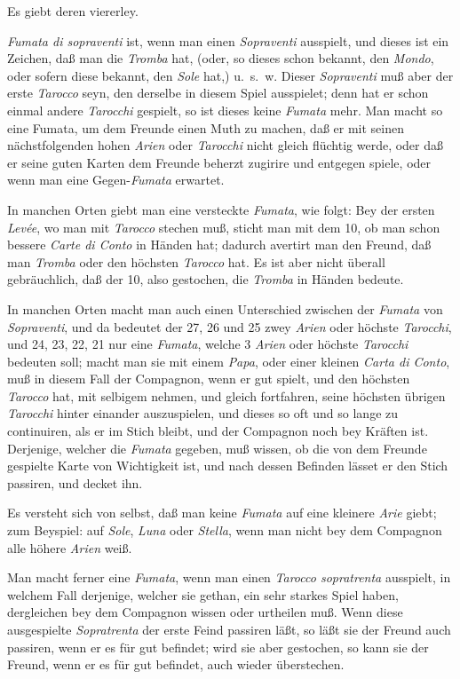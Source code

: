 \documentclass[11pt,a6paper,twoside]{article}
\begin{document}
Es giebt deren viererley.

\textit{Fumata di sopraventi} ist, wenn man einen \textit{Sopraventi} ausspielt, und dieses ist ein Zeichen, daß man die \textit{Tromba} hat, (oder, so dieses schon bekannt, den \textit{Mondo}, oder sofern diese bekannt, den \textit{Sole} hat,) u.~s.~w. Dieser \textit{Sopraventi} muß aber der erste \textit{Tarocco} seyn, den derselbe in diesem Spiel ausspielet; denn hat er schon einmal andere \textit{Tarocchi} gespielt, so ist dieses keine \textit{Fumata} mehr. Man macht so eine Fumata, um dem Freunde einen Muth zu machen, daß er mit seinen nächstfolgenden hohen \textit{Arien} oder \textit{Tarocchi} nicht gleich flüchtig werde, oder daß er seine guten Karten dem Freunde beherzt zugirire und entgegen spiele, oder wenn man eine Gegen-\textit{Fumata} erwartet.

In manchen Orten giebt man eine versteckte \textit{Fumata}, wie folgt: Bey der ersten \textit{Levée}, wo man mit \textit{Tarocco} stechen muß, sticht man mit dem 10, ob man schon bessere \textit{Carte di Conto} in Händen hat; dadurch avertirt man den Freund, daß man \textit{Tromba} oder den höchsten \textit{Tarocco} hat. Es ist aber nicht überall gebräuchlich, daß der 10, also gestochen, die \textit{Tromba} in Händen bedeute.

In manchen Orten macht man auch einen Unterschied zwischen der \textit{Fumata} von \textit{Sopraventi}, und da bedeutet der 27, 26 und 25 zwey \textit{Arien} oder höchste \textit{Tarocchi}, und 24, 23, 22, 21 nur eine \textit{Fumata}, welche 3 \textit{Arien} oder höchste \textit{Tarocchi} bedeuten soll; macht man sie mit einem \textit{Papa}, oder einer kleinen \textit{Carta di Conto}, muß in diesem Fall der Compagnon, wenn er gut spielt, und den höchsten \textit{Tarocco} hat, mit selbigem nehmen, und gleich fortfahren, seine höchsten übrigen \textit{Tarocchi} hinter einander auszuspielen, und dieses so oft und so lange zu continuiren, als er im Stich bleibt, und der Compagnon noch bey Kräften ist. Derjenige, welcher die \textit{Fumata} gegeben, muß wissen, ob die von dem Freunde gespielte Karte von Wichtigkeit ist, und nach dessen Befinden lässet er den Stich passiren, und decket ihn.

Es versteht sich von selbst, daß man keine \textit{Fumata} auf eine kleinere \textit{Arie} giebt; zum Beyspiel: auf \textit{Sole}, \textit{Luna} oder \textit{Stella}, wenn man nicht bey dem Compagnon alle höhere \textit{Arien} weiß.

Man macht ferner eine \textit{Fumata}, wenn man einen \textit{Tarocco sopratrenta} ausspielt, in welchem Fall derjenige, welcher sie gethan, ein sehr starkes Spiel haben, dergleichen bey dem Compagnon wissen oder urtheilen muß. Wenn diese ausgespielte \textit{Sopratrenta} der erste Feind passiren läßt, so läßt sie der Freund auch passiren, wenn er es für gut befindet; wird sie aber gestochen, so kann sie der Freund, wenn er es für gut befindet, auch wieder überstechen.
\end{document}
